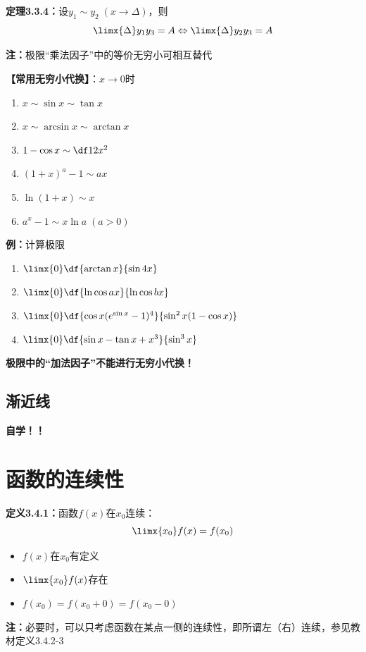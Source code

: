 {\bf 定理3.3.4：}设$y_1\sim y_2\;(x\to\Delta)$，则
$$\limx{\Delta}y_1y_3=A\Leftrightarrow\limx{\Delta}y_2y_3=A$$

{\bf 注：}极限“乘法因子”中的等价无穷小可相互替代

{\bf 【常用无穷小代换】}：$x\to 0$时
\begin{enumerate}[(1)]
  \setlength{\itemindent}{1cm}
  \item $x\sim \sin x\sim \tan x$ 
  \item $x \sim\arcsin x\sim\arctan x$ 
  \item $1-\cos x\sim \df 12 x^2$ 
  \item $(1+x)^a-1\sim ax$ 
  \item $\ln(1+x)\sim x$ 
  \item $a^x-1\sim x\ln a\;(a>0)$
\end{enumerate}

{\bf 例：}计算极限
\begin{enumerate}[(1)]
  \setlength{\itemindent}{1cm}
  \item $\limx{0}\df{\arctan x}{\sin 4x}$ 
  \item $\limx{0}\df{\ln\cos ax}{\ln\cos bx}$ 
  \item $\limx{0}\df{\cos x(e^{\sin x}-1)^4}{\sin^2 x(1-\cos x)}$ 
  \item $\limx{0}\df{\sin x-\tan x+x^3}{\sin^3 x}$
\end{enumerate}

{\bf 极限中的“加法因子”不能进行无穷小代换！}

\subsection{渐近线}

{\bf 自学！！}

\section{函数的连续性}

{\bf 定义3.4.1：}函数$f(x)$在$x_0$连续：
$$\limx{x_0}f(x)=f(x_0)$$

\begin{itemize}
  \item $f(x)$在$x_0$有定义 
  \item $\limx{x_0}f(x)$存在 
  \item $f(x_0)=f(x_0+0)=f(x_0-0)$
\end{itemize}

{\bf 注：}必要时，可以只考虑函数在某点一侧的连续性，即所谓左（右）连续，参见教材定义3.4.2-3

